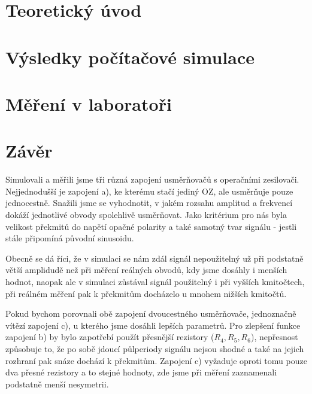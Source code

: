 \documentclass{protokol}
\begin{document}
	\maketitle

	\section{Teoretický úvod}
		
		
	\section{Výsledky počítačové simulace}
		
		
	\clearpage
	\section{Měření v laboratoři}
		
		
		
	\section{Závěr}
		Simulovali a měřili jsme tři různá zapojení usměrňovačů s operačními zesilovači. Nejjednodušší je zapojení a), ke kterému stačí jediný OZ, ale usměrňuje pouze jednocestně.
		Snažili jsme se vyhodnotit, v jakém rozsahu amplitud a frekvencí dokáží jednotlivé obvody spolehlivě usměrňovat. Jako kritérium pro nás byla velikost překmitů do napětí opačné polarity a také samotný tvar signálu - jestli stále připomíná původní sinusoidu. 

		Obecně se dá říci, že v simulaci se nám zdál signál nepoužitelný už při podstatně větší amplidudě než při měření reálných obvodů, kdy jsme dosáhly i menších hodnot, naopak ale v simulaci zůstával signál použitelný i při vyšších kmitočtech, při reálném měření pak k překmitům docházelo u mnohem nižších kmitočtů.

		Pokud bychom porovnali obě zapojení dvoucestného usměrňovače, jednoznačně vítězí zapojení c), u kterého jsme dosáhli lepších parametrů. Pro zlepšení funkce zapojení b) by bylo zapotřebí použít přesnější rezistory (\(R_4,R_5, R_6\)), nepřesnost způsobuje to, že po sobě jdoucí půlperiody signálu nejsou shodné a také na jejich rozhraní pak snáze dochází k překmitům. 
		Zapojení c) vyžaduje oproti tomu pouze dva přesné rezistory a to stejné hodnoty, zde jsme při měření zaznamenali podstatně menší nesymetrii.
\end{document}
